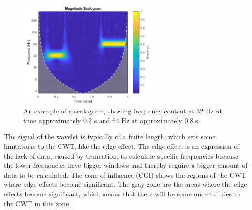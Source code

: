 \begin{figure}[H]
	\centering	\includegraphics[width=0.65\textwidth]{figures/scalogram}
	\caption{An example of a scalogram, showing frequency content at 32 Hz at time approximately 0.2 s and 64 Hz at approximately 0.8 s.\cite{mathworks2017}}
	\label{fig:scalogram}
\end{figure} \vspace{-.3cm}

The signal of the wavelet is typically of a finite length, which sets some limitations to the CWT, like the edge effect. The edge effect is an expression of the lack of data, caused by truncation, to calculate specific frequencies because the lower frequencies have bigger windows and thereby reguire a bigger amount of data to be calculated.\cite{mari1999} The cone of influence (COI) shows the regions of the CWT where edge effects become significant. The gray zone are the areas where the edge effects become significant, which means that there will be some uncertainties to the CWT in this zone.\cite{mathworks2017}


